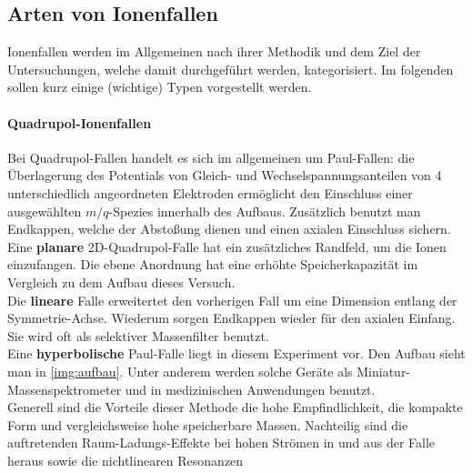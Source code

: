 \documentclass[numbers=noenddot,a4paper,notitlepage,twoside,BCOR15mm]{scrartcl}
\newcommand{\fett}[1]{\textbf{#1}}
\begin{document}
		\subsection{Arten von Ionenfallen}

			Ionenfallen werden im Allgemeinen nach ihrer Methodik und dem Ziel der Untersuchungen, welche damit durchgeführt werden, kategorisiert. Im folgenden sollen kurz einige (wichtige) Typen vorgestellt werden.

				\paragraph{Quadrupol-Ionenfallen}
					Bei Quadrupol-Fallen handelt es sich im allgemeinen um Paul-Fallen: die Überlagerung des Potentials von Gleich- und Wechselspannungsanteilen von 4 unterschiedlich angeordneten Elektroden ermöglicht den Einschluss einer ausgewählten $m/q$-Spezies innerhalb des Aufbaus. Zusätzlich benutzt man Endkappen, welche der Abstoßung dienen und einen axialen Einschluss sichern.\\
					Eine \fett{planare} 2D-Quadrupol-Falle hat ein zusätzliches Randfeld, um die Ionen einzufangen. Die ebene Anordnung hat eine erhöhte Speicherkapazität im Vergleich zu dem Aufbau dieses Versuch.\\
					Die \fett{lineare} Falle erweitertet den vorherigen Fall um eine Dimension entlang der Symmetrie-Achse. Wiederum sorgen Endkappen wieder für den axialen Einfang. Sie wird oft als selektiver Massenfilter benutzt.\\
					Eine \fett{hyperbolische} Paul-Falle liegt in diesem Experiment vor. Den Aufbau sieht man in \autoref{img:aufbau}. Unter anderem werden solche Geräte als Miniatur-Massenspektrometer und in medizinischen Anwendungen benutzt.\\
					Generell sind die Vorteile dieser Methode die hohe Empfindlichkeit, die kompakte Form und vergleichsweise hohe speicherbare Massen. Nachteilig sind die auftretenden Raum-Ladungs-Effekte bei hohen Strömen in und aus der Falle heraus sowie die nichtlinearen Resonanzen
\end{document}
